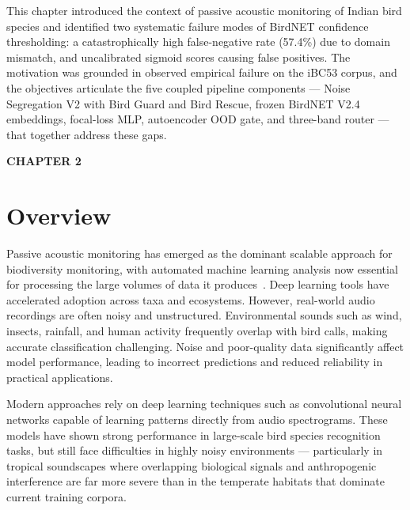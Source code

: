\documentclass[a4paper,12pt]{article}
\begin{document}
\noindent
This chapter introduced the context of passive acoustic monitoring of Indian bird species and
identified two systematic failure modes of BirdNET confidence thresholding: a catastrophically
high false-negative rate (57.4\%) due to domain mismatch, and uncalibrated sigmoid scores
causing false positives. The motivation was grounded in observed empirical failure on the iBC53
corpus, and the objectives articulate the five coupled pipeline components --- Noise Segregation V2
with Bird Guard and Bird Rescue, frozen BirdNET V2.4 embeddings, focal-loss MLP, autoencoder OOD
gate, and three-band router --- that together address these gaps.

\newpage
\thispagestyle{plain}

\begin{center}
{\fontsize{18}{20}\bfseries CHAPTER 2}
\end{center}


\vspace{0.5cm}

\setcounter{section}{0}
\renewcommand{\thesection}{2.\arabic{section}}

\section{Overview}

\noindent
Passive acoustic monitoring has emerged as the dominant scalable approach for biodiversity monitoring,
with automated machine learning analysis now essential for processing the large volumes of data it
produces~\cite{Stowell}. Deep learning tools have accelerated adoption across taxa and ecosystems.
However, real-world audio recordings are often noisy and unstructured. Environmental sounds such as
wind, insects, rainfall, and human activity frequently overlap with bird calls, making accurate
classification challenging. Noise and poor-quality data significantly affect model performance,
leading to incorrect predictions and reduced reliability in practical applications.

\vspace{0.3cm}

\noindent
Modern approaches rely on deep learning techniques such as convolutional neural networks capable of
learning patterns directly from audio spectrograms. These models have shown strong performance in
large-scale bird species recognition tasks, but still face difficulties in highly noisy environments
--- particularly in tropical soundscapes where overlapping biological signals and anthropogenic
interference are far more severe than in the temperate habitats that dominate current training
corpora.
\end{document}
